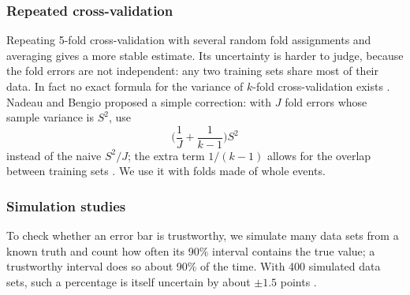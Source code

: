 
\subsubsection{Repeated cross-validation}
Repeating 5-fold cross-validation with several random fold assignments and averaging gives a more stable estimate.
Its uncertainty is harder to judge, because the fold errors are not independent: any two training sets share most
of their data. In fact no exact formula for the variance of $k$-fold cross-validation exists
\cite[Theorem 6, p.~1098]{Bengio:2004}. Nadeau and Bengio proposed a simple correction: with $J$ fold errors whose sample
variance is $S^2$, use
\[
\Big(\frac1J+\frac{1}{k-1}\Big)S^2
\]
instead of the naive $S^2/J$; the extra term $1/(k-1)$ allows for the overlap between training sets
\cite[Section 3.1, p.~248]{Nadeau:2003}. We use it with folds made of whole events.

\subsubsection{Simulation studies}
To check whether an error bar is trustworthy, we simulate many data sets from a known truth and count how often its
90\% interval contains the true value; a trustworthy interval does so about 90\% of the time. With 400 simulated
data sets, such a percentage is itself uncertain by about $\pm1.5$ points \cite[Section 5.2, Table 6]{Morris:2019}.
